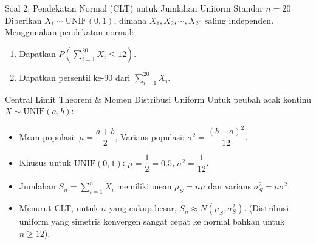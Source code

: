 \documentclass[10pt,twoside]{article}
\begin{document}
\begin{soalbox}{Soal 2: Pendekatan Normal (CLT) untuk Jumlahan Uniform Standar $n=20$}
Diberikan $X_i \sim \text{UNIF}(0,1)$, dimana $X_1, X_2, \cdots, X_{20}$ saling independen. Menggunakan pendekatan normal:
\begin{enumerate}[label=(\alph*)]
  \item Dapatkan $P\left(\sum_{i=1}^{20} X_i \le 12\right)$.
  \item Dapatkan persentil ke-90 dari $\sum_{i=1}^{20} X_i$.
\end{enumerate}
\end{soalbox}

\begin{tipbox}{Central Limit Theorem \& Momen Distribusi Uniform}
Untuk peubah acak kontinu $X \sim \text{UNIF}(a, b)$:
\begin{itemize}
  \item Mean populasi: $\mu = \dfrac{a + b}{2}$, \qquad Varians populasi: $\sigma^2 = \dfrac{(b - a)^2}{12}$.
  \item Khusus untuk $\text{UNIF}(0, 1)$: $\mu = \dfrac{1}{2} = 0.5$, \qquad $\sigma^2 = \dfrac{1}{12}$.
  \item Jumlahan $S_n = \sum_{i=1}^n X_i$ memiliki mean $\mu_S = n\mu$ dan varians $\sigma_S^2 = n\sigma^2$.
  \item Menurut CLT, untuk $n$ yang cukup besar, $S_n \approx N(\mu_S, \sigma_S^2)$. (Distribusi uniform yang simetris konvergen sangat cepat ke normal bahkan untuk $n \ge 12$).
\end{itemize}
\end{tipbox}
\end{document}
